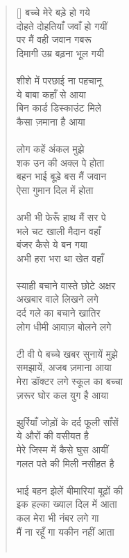 \begin{verse}[\versewidth]\texthindi{
बच्चे मेरे बड़े हो गये\\
दोहते दोहतियाँ जवाँ हो गयीं\\
पर मैं वही जवान गबरू\\
दिमागी उम्र बढ़ना भूल गयी\\
\\
शीशे में परछाई ना पहचानू\\
ये बाबा कहाँ से आया\\
बिन कार्ड डिस्काउंट मिले\\
कैसा ज़माना है आया\\
\\
लोग कहें अंकल मुझे\\
शक उन की अक्ल पे होता\\
बहन भाई बूड़े बस मैं जवान\\
ऐसा गुमान दिल में होता\\
\\
अभी भी फेरूँ हाथ मैं सर पे\\
भले चट खाली मैदान वहाँ\\
बंजर कैसे ये बन गया\\
अभी हरा भरा था खेत वहाँ\\
\\
स्याही बचाने वास्ते छोटे अक्षर\\
अखबार वाले लिखने लगे\\
दर्द गले का बचाने खातिर\\
लोग धीमी आवाज़ बोलने लगे\\
\\
टी वी पे बच्चे खबर सुनायें मुझे\\
समझायें, अजब ज़माना आया\\
मेरा डॉक्टर लगे स्कूल का बच्चा\\
ज़रूर घोर कल युग है आया\\
\\
झुर्रियाँ जोड़ों के दर्द फूली साँसें\\
ये औरों की वसीयत है\\
मेरे जिस्म में कैसे घुस आयीं\\
गलत पते की मिली नसीहत है\\
\\
 भाई बहन झेलें बीमारियां बूढ़ों की\\
इक हल्का ख्याल दिल में आता\\
कल मेरा भी नंबर लगे गा\\
मैं ना रहूँ गा यकीन नहीं आता\\
\\
}
\end{verse}

